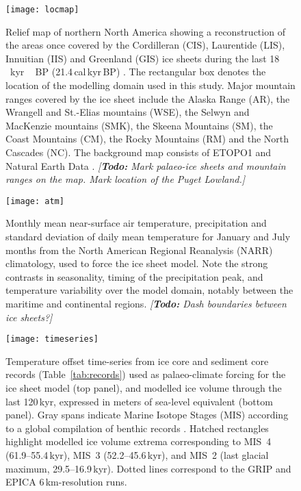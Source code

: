 \documentclass[tc, manuscript]{copernicus}
\newcommand{\todo}[1]{\emph{[\textbf{Todo:} #1]}}
\begin{document}
\begin{figure}
  \texttt{[image: locmap]}
  \caption{Relief map of northern North America showing a reconstruction of the
           areas once covered by the Cordilleran (CIS), Laurentide (LIS),
           Innuitian (IIS) and Greenland (GIS) ice sheets during the last
           18\,\unit{\,kyr\,BP} (21.4\,cal\,kyr\,BP)
           \citep{Dyke.2004}. The rectangular box denotes the location of the
           modelling domain used in this study. Major mountain ranges covered
           by the ice sheet include the Alaska Range (AR), the Wrangell and
           St.-Elias mountains (WSE), the Selwyn and MacKenzie mountains (SMK),
           the Skeena Mountains (SM), the Coast Mountains (CM), the Rocky
           Mountains (RM) and the North Cascades (NC). The background
           map consists of ETOPO1 \citep{Amante.Eakins.2009} and Natural Earth
           Data \citep{Patterson.Kelso.2014}.
           \todo{Mark palaeo-ice sheets and mountain ranges on the map.
                 Mark location of the Puget Lowland.}}
  \label{fig:locmap}
\end{figure}

\begin{figure}
  \texttt{[image: atm]}
  \caption{Monthly mean near-surface air temperature, precipitation and
           standard deviation of daily mean temperature for January and July
           months from the North American Regional Reanalysis (NARR)
           climatology, used to force the ice sheet model. Note the
           strong contrasts in seasonality, timing of the precipitation peak,
           and temperature variability over the model domain, notably between
           the maritime and continental regions.
           \todo{Dash boundaries between ice sheets?}}
  \label{fig:atm}
\end{figure}

\begin{figure*}
  \texttt{[image: timeseries]}
  \caption{Temperature offset time-series from ice core and sediment core
           records (Table~\ref{tab:records}) used as palaeo-climate forcing for
           the ice sheet model (top panel), and modelled ice volume
           through the last 120\,kyr, expressed in meters of sea-level
           equivalent (bottom panel). Gray spans indicate Marine Isotope
           Stages (MIS) according to a global compilation of benthic
            records \citep{Lisiecki.Raymo.2005}. Hatched
           rectangles highlight modelled ice volume extrema corresponding to
           MIS~4 (61.9--55.4\,kyr), MIS~3 (52.2--45.6\,kyr), and
           MIS~2 (last glacial maximum, 29.5--16.9\,kyr). Dotted lines
           correspond to the GRIP and EPICA 6\,km-resolution runs.}
  \label{fig:timeseries}
\end{figure*}
\end{document}
